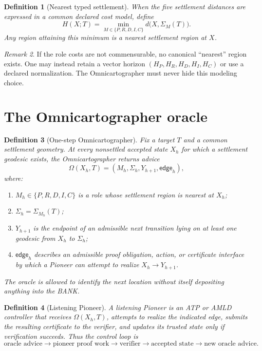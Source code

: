\documentclass[11pt]{article}
\newtheorem{definition}{Definition}[section]
\theoremstyle{remark}
\newtheorem{remark}[definition]{Remark}
\newcommand{\Omni}{\Omega}
\newcommand{\Sett}{\Sigma}
\begin{document}
\begin{definition}[Nearest typed settlement]
When the five settlement distances are expressed in a common declared cost model, define
\[
H(X;T)=\min_{M\in\{P,R,D,I,C\}} d\bigl(X,\Sett_M(T)\bigr).
\]
Any region attaining this minimum is a nearest settlement region at $X$.
\end{definition}

\begin{remark}
If the role costs are not commensurable, no canonical ``nearest'' region exists. One may instead retain a vector horizon $(H_P,H_R,H_D,H_I,H_C)$ or use a declared normalization. The Omnicartographer must never hide this modeling choice.
\end{remark}

\section{The Omnicartographer oracle}

\begin{definition}[One-step Omnicartographer]
Fix a target $T$ and a common settlement geometry. At every nonsettled accepted state $X_h$ for which a settlement geodesic exists, the Omnicartographer returns advice
\[
\Omni(X_h,T)=(M_h,\Sett_h,Y_{h+1},\mathsf{edge}_h),
\]
where:
\begin{enumerate}[label=(\alph*)]
\item $M_h\in\{P,R,D,I,C\}$ is a role whose settlement region is nearest at $X_h$;
\item $\Sett_h=\Sett_{M_h}(T)$;
\item $Y_{h+1}$ is the endpoint of an admissible next transition lying on at least one geodesic from $X_h$ to $\Sett_h$;
\item $\mathsf{edge}_h$ describes an admissible proof obligation, action, or certificate interface by which a Pioneer can attempt to realize $X_h\to Y_{h+1}$.
\end{enumerate}
The oracle is allowed to identify the next location without itself depositing anything into the BANK.
\end{definition}

\begin{definition}[Listening Pioneer]
A listening Pioneer is an ATP or AMLD controller that receives $\Omni(X_h,T)$, attempts to realize the indicated edge, submits the resulting certificate to the verifier, and updates its trusted state only if verification succeeds. Thus the control loop is
\[
\text{oracle advice}\to\text{pioneer proof work}\to\text{verifier}\to\text{accepted state}\to\text{new oracle advice}.
\]
\end{definition}
\end{document}
